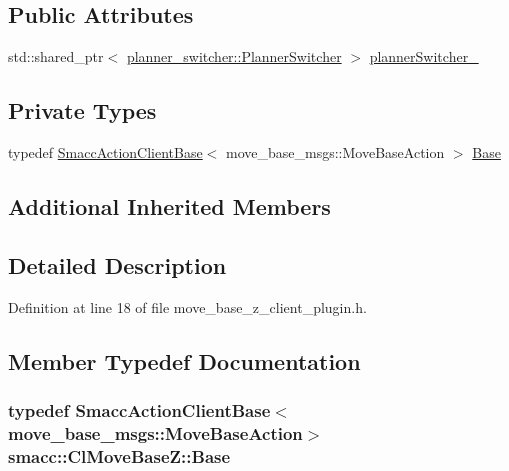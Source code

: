 \subsection*{Public Attributes}
\begin{DoxyCompactItemize}
\item 
std\+::shared\+\_\+ptr$<$ \hyperlink{classplanner__switcher_1_1PlannerSwitcher}{planner\+\_\+switcher\+::\+Planner\+Switcher} $>$ \hyperlink{classsmacc_1_1ClMoveBaseZ_a712e0df77c9629930e03cbb4c539b485}{planner\+Switcher\+\_\+}
\end{DoxyCompactItemize}
\subsection*{Private Types}
\begin{DoxyCompactItemize}
\item 
typedef \hyperlink{classsmacc_1_1SmaccActionClientBase}{Smacc\+Action\+Client\+Base}$<$ move\+\_\+base\+\_\+msgs\+::\+Move\+Base\+Action $>$ \hyperlink{classsmacc_1_1ClMoveBaseZ_a87baee189885db32480cb8f90f425528}{Base}
\end{DoxyCompactItemize}
\subsection*{Additional Inherited Members}


\subsection{Detailed Description}


Definition at line 18 of file move\+\_\+base\+\_\+z\+\_\+client\+\_\+plugin.\+h.



\subsection{Member Typedef Documentation}
\subsubsection[{\texorpdfstring{Base}{Base}}]{\setlength{\rightskip}{0pt plus 5cm}typedef {\bf Smacc\+Action\+Client\+Base}$<$move\+\_\+base\+\_\+msgs\+::\+Move\+Base\+Action$>$ {\bf smacc\+::\+Cl\+Move\+Base\+Z\+::\+Base}\hspace{0.3cm}{\ttfamily [private]}}\hypertarget{classsmacc_1_1ClMoveBaseZ_a87baee189885db32480cb8f90f425528}{}\label{classsmacc_1_1ClMoveBaseZ_a87baee189885db32480cb8f90f425528}


